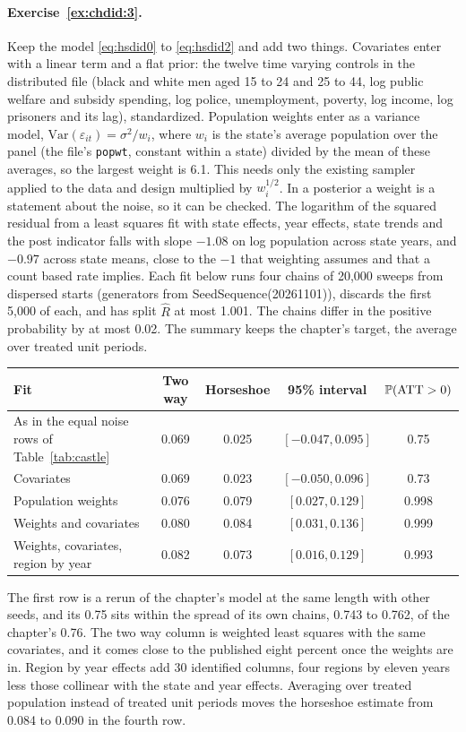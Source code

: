 \paragraph{Exercise~\ref{ex:chdid:3}.} Keep the model \eqref{eq:hsdid0} to \eqref{eq:hsdid2} and add two things. Covariates enter with a linear term and a flat prior: the twelve time varying controls in the distributed file (black and white men aged 15 to 24 and 25 to 44, log public welfare and subsidy spending, log police, unemployment, poverty, log income, log prisoners and its lag), standardized. Population weights enter as a variance model, $\mathrm{Var}(\varepsilon_{it}) = \sigma^2/w_i$, where $w_i$ is the state's average population over the panel (the file's \texttt{popwt}, constant within a state) divided by the mean of these averages, so the largest weight is 6.1. This needs only the existing sampler applied to the data and design multiplied by $w_i^{1/2}$. In a posterior a weight is a statement about the noise, so it can be checked. The logarithm of the squared residual from a least squares fit with state effects, year effects, state trends and the post indicator falls with slope $-1.08$ on log population across state years, and $-0.97$ across state means, close to the $-1$ that weighting assumes and that a count based rate implies. Each fit below runs four chains of 20,000 sweeps from dispersed starts (generators from SeedSequence(20261101)), discards the first 5,000 of each, and has split $\hat R$ at most 1.001. The chains differ in the positive probability by at most 0.02. The summary keeps the chapter's target, the average over treated unit periods.
\begin{center}
\small
\small
\begin{tabular}{@{}p{4.4cm}cccc@{}}
\toprule
Fit & Two way & Horseshoe & 95\% interval & $\mathbb{P}(\mathrm{ATT} > 0)$ \\
\midrule
As in the equal noise rows of Table~\ref{tab:castle} & 0.069 & 0.025 & $[-0.047, 0.095]$ & 0.75 \\
Covariates & 0.069 & 0.023 & $[-0.050, 0.096]$ & 0.73 \\
Population weights & 0.076 & 0.079 & $[0.027, 0.129]$ & 0.998 \\
Weights and covariates & 0.080 & 0.084 & $[0.031, 0.136]$ & 0.999 \\
Weights, covariates, region by year & 0.082 & 0.073 & $[0.016, 0.129]$ & 0.993 \\
\bottomrule
\end{tabular}
\end{center}
The first row is a rerun of the chapter's model at the same length with other seeds, and its 0.75 sits within the spread of its own chains, 0.743 to 0.762, of the chapter's 0.76. The two way column is weighted least squares with the same covariates, and it comes close to the published eight percent once the weights are in. Region by year effects add 30 identified columns, four regions by eleven years less those collinear with the state and year effects. Averaging over treated population instead of treated unit periods moves the horseshoe estimate from 0.084 to 0.090 in the fourth row.

